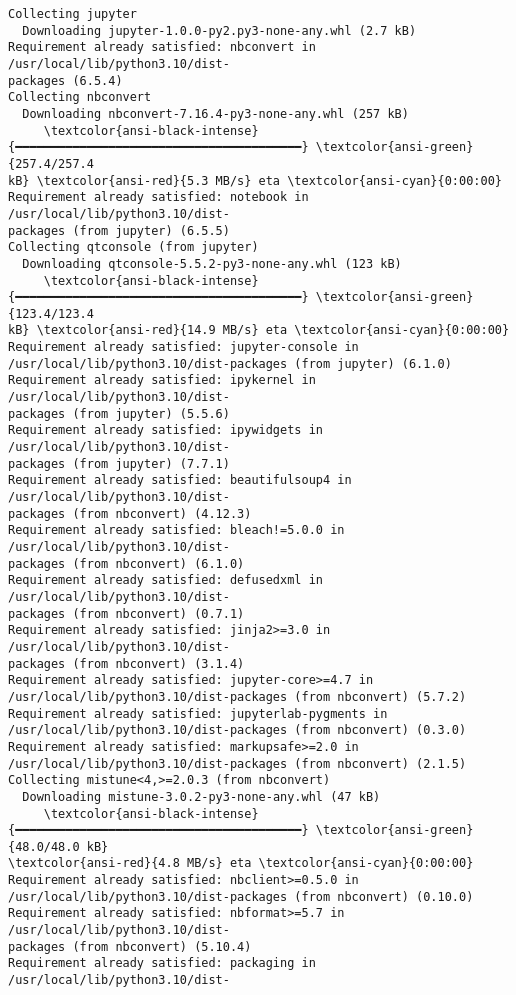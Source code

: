 \documentclass[11pt]{article}
\begin{document}
    \begin{Verbatim}[commandchars=\\\{\}]
Collecting jupyter
  Downloading jupyter-1.0.0-py2.py3-none-any.whl (2.7 kB)
Requirement already satisfied: nbconvert in /usr/local/lib/python3.10/dist-
packages (6.5.4)
Collecting nbconvert
  Downloading nbconvert-7.16.4-py3-none-any.whl (257 kB)
     \textcolor{ansi-black-intense}{━━━━━━━━━━━━━━━━━━━━━━━━━━━━━━━━━━━━━━━━} \textcolor{ansi-green}{257.4/257.4
kB} \textcolor{ansi-red}{5.3 MB/s} eta \textcolor{ansi-cyan}{0:00:00}
Requirement already satisfied: notebook in /usr/local/lib/python3.10/dist-
packages (from jupyter) (6.5.5)
Collecting qtconsole (from jupyter)
  Downloading qtconsole-5.5.2-py3-none-any.whl (123 kB)
     \textcolor{ansi-black-intense}{━━━━━━━━━━━━━━━━━━━━━━━━━━━━━━━━━━━━━━━━} \textcolor{ansi-green}{123.4/123.4
kB} \textcolor{ansi-red}{14.9 MB/s} eta \textcolor{ansi-cyan}{0:00:00}
Requirement already satisfied: jupyter-console in
/usr/local/lib/python3.10/dist-packages (from jupyter) (6.1.0)
Requirement already satisfied: ipykernel in /usr/local/lib/python3.10/dist-
packages (from jupyter) (5.5.6)
Requirement already satisfied: ipywidgets in /usr/local/lib/python3.10/dist-
packages (from jupyter) (7.7.1)
Requirement already satisfied: beautifulsoup4 in /usr/local/lib/python3.10/dist-
packages (from nbconvert) (4.12.3)
Requirement already satisfied: bleach!=5.0.0 in /usr/local/lib/python3.10/dist-
packages (from nbconvert) (6.1.0)
Requirement already satisfied: defusedxml in /usr/local/lib/python3.10/dist-
packages (from nbconvert) (0.7.1)
Requirement already satisfied: jinja2>=3.0 in /usr/local/lib/python3.10/dist-
packages (from nbconvert) (3.1.4)
Requirement already satisfied: jupyter-core>=4.7 in
/usr/local/lib/python3.10/dist-packages (from nbconvert) (5.7.2)
Requirement already satisfied: jupyterlab-pygments in
/usr/local/lib/python3.10/dist-packages (from nbconvert) (0.3.0)
Requirement already satisfied: markupsafe>=2.0 in
/usr/local/lib/python3.10/dist-packages (from nbconvert) (2.1.5)
Collecting mistune<4,>=2.0.3 (from nbconvert)
  Downloading mistune-3.0.2-py3-none-any.whl (47 kB)
     \textcolor{ansi-black-intense}{━━━━━━━━━━━━━━━━━━━━━━━━━━━━━━━━━━━━━━━━} \textcolor{ansi-green}{48.0/48.0 kB}
\textcolor{ansi-red}{4.8 MB/s} eta \textcolor{ansi-cyan}{0:00:00}
Requirement already satisfied: nbclient>=0.5.0 in
/usr/local/lib/python3.10/dist-packages (from nbconvert) (0.10.0)
Requirement already satisfied: nbformat>=5.7 in /usr/local/lib/python3.10/dist-
packages (from nbconvert) (5.10.4)
Requirement already satisfied: packaging in /usr/local/lib/python3.10/dist-

\end{Verbatim}
\end{document}
